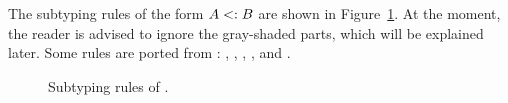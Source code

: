 


The subtyping rules of the form $A <: B$ are shown in 
Figure~\ref{fig:fi-subtype}. 
At the moment, the reader is advised to ignore the
gray-shaded parts, which will be explained later. 
Some rules are ported from \oldname: , 
,
, ,  and
.

\begin{figure}[t]
\begin{spacing}{0.5}
\end{spacing}
  \caption{Subtyping rules of \name.}
  \label{fig:fi-subtype}
\end{figure}



